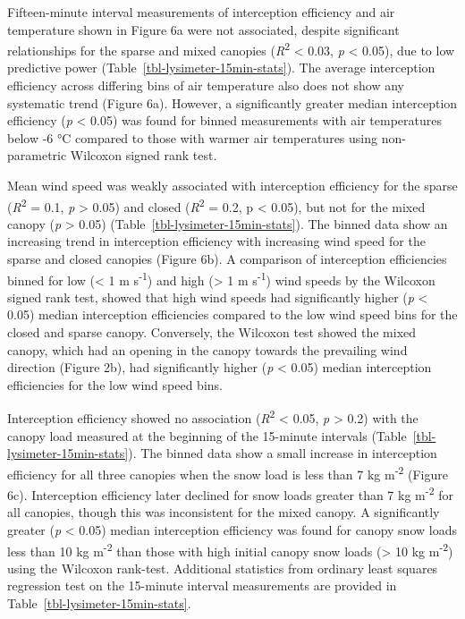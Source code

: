 \documentclass[
  letterpaper,
  DIV=11,
  numbers=noendperiod]{scrartcl}
\begin{document}
Fifteen-minute interval measurements of interception efficiency and air
temperature shown in Figure 6a were not associated, despite significant
relationships for the sparse and mixed canopies
(\emph{R}\textsuperscript{2} \textless{} 0.03, \emph{p} \textless{}
0.05), due to low predictive power
(Table~\ref{tbl-lysimeter-15min-stats}). The average interception
efficiency across differing bins of air temperature also does not show
any systematic trend (Figure 6a). However, a significantly greater
median interception efficiency (\emph{p} \textless{} 0.05) was found for
binned measurements with air temperatures below -6 °C compared to those
with warmer air temperatures using non-parametric Wilcoxon signed rank
test.

Mean wind speed was weakly associated with interception efficiency for
the sparse (\emph{R}\textsuperscript{2} = 0.1, \emph{p} \textgreater{}
0.05) and closed (\emph{R}\textsuperscript{2} = 0.2, p \textless{}
0.05), but not for the mixed canopy (\emph{p} \textgreater{} 0.05)
(Table~\ref{tbl-lysimeter-15min-stats}). The binned data show an
increasing trend in interception efficiency with increasing wind speed
for the sparse and closed canopies (Figure 6b). A comparison of
interception efficiencies binned for low (\textless{} 1 m
s\textsuperscript{-1}) and high (\textgreater{} 1 m
s\textsuperscript{-1}) wind speeds by the Wilcoxon signed rank test,
showed that high wind speeds had significantly higher (\emph{p}
\textless{} 0.05) median interception efficiencies compared to the low
wind speed bins for the closed and sparse canopy. Conversely, the
Wilcoxon test showed the mixed canopy, which had an opening in the
canopy towards the prevailing wind direction (Figure 2b), had
significantly higher (\emph{p} \textless{} 0.05) median interception
efficiencies for the low wind speed bins.

Interception efficiency showed no association
(\emph{R}\textsuperscript{2} \textless{} 0.05, \emph{p} \textgreater{}
0.2) with the canopy load measured at the beginning of the 15-minute
intervals (Table~\ref{tbl-lysimeter-15min-stats}). The binned data show
a small increase in interception efficiency for all three canopies when
the snow load is less than 7 kg m\textsuperscript{-2} (Figure 6c).
Interception efficiency later declined for snow loads greater than 7 kg
m\textsuperscript{-2} for all canopies, though this was inconsistent for
the mixed canopy. A significantly greater (\emph{p} \textless{} 0.05)
median interception efficiency was found for canopy snow loads less than
10 kg m\textsuperscript{-2} than those with high initial canopy snow
loads (\textgreater{} 10 kg m\textsuperscript{-2}) using the Wilcoxon
rank-test. Additional statistics from ordinary least squares regression
test on the 15-minute interval measurements are provided in
Table~\ref{tbl-lysimeter-15min-stats}.
\end{document}
